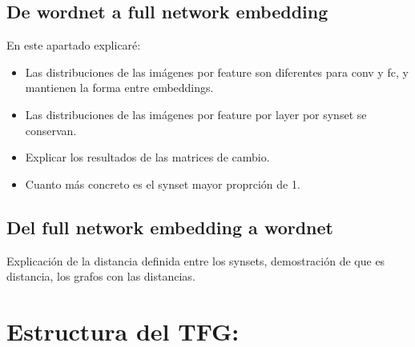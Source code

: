 \documentclass[12,twoside]{TFG-GM}
\theoremstyle{definition}
\theoremstyle{remark}
\begin{document}
\subsection{De wordnet a full network embedding}
En este apartado explicaré: 

\begin{itemize}
\item Las distribuciones de las imágenes por feature son diferentes para conv y fc, y mantienen la forma entre embeddings.
\item Las distribuciones de las imágenes por feature por layer por synset se conservan. 
\item Explicar los resultados de las matrices de cambio. 
\item Cuanto más concreto es el synset mayor proprción de 1. 

\end{itemize}



\subsection{Del full network embedding a wordnet}

Explicación de la distancia definida entre los synsets, demostración de que es distancia, los grafos con las distancias. 





\section{Estructura del TFG: }
\end{document}
